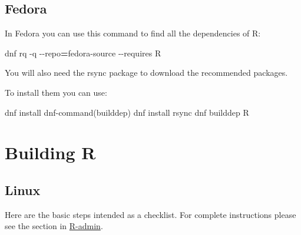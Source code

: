 \documentclass[
]{book}
\newenvironment{Shaded}{\begin{snugshade}}{\end{snugshade}}
\newcommand{\AttributeTok}[1]{\textcolor[rgb]{0.77,0.63,0.00}{#1}}
\newcommand{\ExtensionTok}[1]{#1}
\newcommand{\NormalTok}[1]{#1}
\newcommand{\OperatorTok}[1]{\textcolor[rgb]{0.81,0.36,0.00}{\textbf{#1}}}
\newcommand{\StringTok}[1]{\textcolor[rgb]{0.31,0.60,0.02}{#1}}
\begin{document}
\hypertarget{fedora}{%
\subsection{Fedora}\label{fedora}}

In Fedora you can use this command to find all the dependencies of R:

\begin{Shaded}
\begin{Highlighting}[]
\ExtensionTok{dnf}\NormalTok{ rq }\AttributeTok{{-}q} \AttributeTok{{-}{-}repo}\OperatorTok{=}\NormalTok{fedora{-}source }\AttributeTok{{-}{-}requires}\NormalTok{ R }
\end{Highlighting}
\end{Shaded}

You will also need the rsync package to download the recommended packages.

To install them you can use:

\begin{Shaded}
\begin{Highlighting}[]
\ExtensionTok{dnf}\NormalTok{ install }\StringTok{\textquotesingle{}dnf{-}command(builddep)\textquotesingle{}}
\ExtensionTok{dnf}\NormalTok{ install rsync}
\ExtensionTok{dnf}\NormalTok{ builddep R}
\end{Highlighting}
\end{Shaded}

\hypertarget{building-r}{%
\section{Building R}\label{building-r}}

\hypertarget{linux}{%
\subsection{Linux}\label{linux}}

Here are the basic steps intended as a checklist.
For complete instructions please see the section in \href{https://cran.r-project.org/doc/manuals/r-devel/R-admin.html\#Installing-R-under-Unix_002dalikes}{R-admin}.
\end{document}
